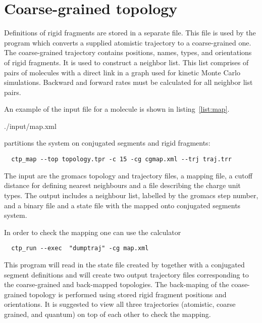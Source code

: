 \section{Coarse-grained topology}
\label{sec:coarsegrained}

Definitions of rigid fragments are stored in a separate \xml file. This file is used by the program \ctpmap which converts a supplied atomistic trajectory to a coarse-grained one. The coarse-grained trajectory contains positions, names, types, and orientations of rigid fragments. It is used to construct a neighbor list. This list comprises of pairs of molecules with a direct link in a graph used for kinetic Monte Carlo simulations. Backward and forward rates must be calculated for all neighbor list pairs.  

An example of the input file for a \dcvt molecule is shown in listing~\ref{list:map}. 

\clearpage

%
{./input/map.xml}


\ctpmap partitions the system on conjugated segments and rigid fragments:
\begin{verbatim}
  ctp_map --top topology.tpr -c 15 -cg cgmap.xml --trj traj.trr
\end{verbatim}
The input are the gromacs topology and trajectory files, a mapping file, a cutoff distance for defining nearest neighbours and a file describing the charge unit types. The output includes a neighbour list, labelled by the gromacs step number, and a binary 
file and a state file with the mapped onto conjugated segments system. 

In order to check the mapping one can use the \dumptraj calculator
\begin{verbatim}
  ctp_run --exec  "dumptraj" -cg map.xml 
\end{verbatim}

This program will read in the state file created by \ctpmap together with a conjugated segment definitions and will create two output trajectory files corresponding to the coarse-grained and back-mapped topologies. The back-maping of the coase-grained topology is performed using stored rigid fragment positions and orientations. It is suggested to view all three trajectories (atomistic, coarse grained, and quantum) on top of each other to check the mapping.


% 
